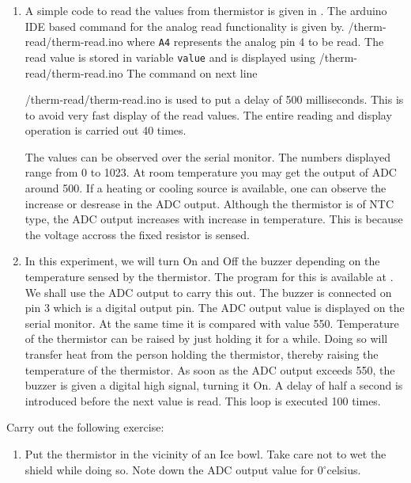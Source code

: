 \begin{enumerate}
\item A simple code to read the values from thermistor is given in . The arduino IDE based command for the analog read functionality is given by.
  {\LocTHERMardcode/therm-read/therm-read.ino} 
where {\tt A4} represents the analog pin 4 to be read. The read value is stored in variable {\tt value} and is displayed using   {\LocTHERMardcode/therm-read/therm-read.ino} 
The command on next line

  {\LocTHERMardcode/therm-read/therm-read.ino} 
 is used to put a delay of 500 milliseconds. This is to avoid very fast display of the read values. The entire reading and display operation is carried out 40 times.

The values can be observed over the serial monitor. The numbers displayed range from 0 to 1023. At room temperature you may get the output of ADC around 500. If a heating or cooling source is available, one can observe the increase or desrease in the ADC output. Although the thermistor is of NTC type, the ADC output increases with increase in temperature. This is because the voltage accross the fixed resistor is sensed.

\item In this experiment, we will turn On and Off the buzzer depending on the temperature sensed by the thermistor. The program for this is available at . We shall use the ADC output to carry this out. The buzzer is connected on pin 3 which is a digital output pin. The ADC output value is displayed on the serial monitor. At the same time it is compared with value 550. Temperature of the thermistor can be raised by just holding it for a while. Doing so will transfer heat from the person holding the thermistor, thereby raising the temperature of the thermistor. As soon as the ADC output exceeds 550, the buzzer is given a digital high signal, turning it On. A delay of half a second is introduced before the next value is read. This loop is executed 100 times.
\end{enumerate}

\begin{exercise}
Carry out the following exercise:
\begin{enumerate}
\item Put the thermistor in the vicinity of an Ice bowl. Take care not to wet the shield while doing so. Note down the ADC output value for 0$^{\circ}$celsius.
\end{enumerate}
\end{exercise}

